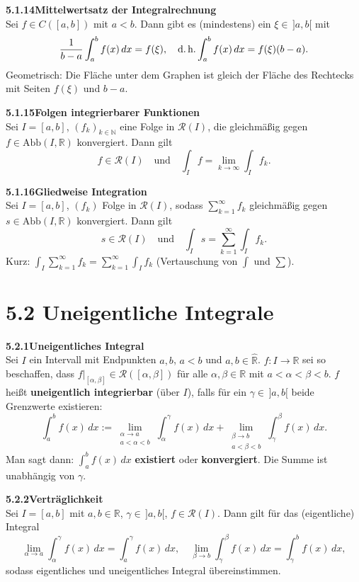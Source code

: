 \documentclass[a4paper,12pt]{article}
\newcommand{\gentry}[3]{%
  \noindent\textbf{#1\quad #2}\nopagebreak\\[0.2em]
  #3\par\smallskip
}
\begin{document}
\gentry{5.1.14}{Mittelwertsatz der Integralrechnung}{%
  Sei $f \in C([a,b])$ mit $a<b$. Dann gibt es (mindestens) ein
  $\xi \in\,]a,b[$ mit
  \[
    \frac{1}{b-a} \int_a^b f(x)\,dx = f(\xi),
    \quad \text{d.\,h.} \int_a^b f(x)\,dx = f(\xi)(b-a).
  \]
  Geometrisch: Die Fläche unter dem Graphen ist gleich der Fläche des Rechtecks
  mit Seiten $f(\xi)$ und $b-a$.
}

\gentry{5.1.15}{Folgen integrierbarer Funktionen}{%
  Sei $I=[a,b]$, $(f_k)_{k\in\mathbb{N}}$ eine Folge in $\mathcal{R}(I)$, die
  gleichmäßig gegen $f \in \mathrm{Abb}(I,\mathbb{R})$ konvergiert. Dann gilt
  \[
    f \in \mathcal{R}(I) \quad \text{und} \quad \int_I f = \lim_{k\to\infty} \int_I f_k.
  \]
}

\gentry{5.1.16}{Gliedweise Integration}{%
  Sei $I=[a,b]$, $(f_k)$ Folge in $\mathcal{R}(I)$, sodass $\sum_{k=1}^\infty f_k$
  gleichmäßig gegen $s \in \mathrm{Abb}(I, \mathbb{R})$ konvergiert. Dann gilt
  \[
    s \in \mathcal{R}(I) \quad \text{und} \quad \int_I s = \sum_{k=1}^\infty \int_I f_k.
  \]
  Kurz: $\int_I \sum_{k=1}^\infty f_k = \sum_{k=1}^\infty \int_I f_k$ (Vertauschung von
  $\int$ und $\sum$).
}

\section*{5.2 \quad Uneigentliche Integrale}

\gentry{5.2.1}{Uneigentliches Integral}{%
  Sei $I$ ein Intervall mit Endpunkten $a, b$, $a<b$ und $a,b \in \widehat{\mathbb{R}}$.
  $f: I \to \mathbb{R}$ sei so beschaffen, dass $f|_{[\alpha,\beta]} \in \mathcal{R}([\alpha,\beta])$
  für alle $\alpha, \beta \in \mathbb{R}$ mit $a<\alpha<\beta<b$.
  $f$ heißt \textbf{uneigentlich integrierbar} (über $I$), falls für ein
  $\gamma \in\,]a,b[$ beide Grenzwerte existieren:
  \[
    \int_a^b f(x)\,dx := \lim_{\substack{\alpha \to a\\ a<\alpha<b}}\int_\alpha^\gamma f(x)\,dx
    + \lim_{\substack{\beta \to b\\ a<\beta<b}}\int_\gamma^\beta f(x)\,dx.
  \]
  Man sagt dann: $\int_a^b f(x)\,dx$ \textbf{existiert} oder \textbf{konvergiert}.
  Die Summe ist unabhängig von $\gamma$.
}

\gentry{5.2.2}{Verträglichkeit}{%
  Sei $I=[a,b]$ mit $a,b\in\mathbb{R}$, $\gamma \in\,]a,b[$, $f \in \mathcal{R}(I)$.
  Dann gilt für das (eigentliche) Integral
  \[
    \lim_{\alpha \to a} \int_\alpha^\gamma f(x)\,dx = \int_a^\gamma f(x)\,dx,
    \quad \lim_{\beta \to b} \int_\gamma^\beta f(x)\,dx = \int_\gamma^b f(x)\,dx,
  \]
  sodass eigentliches und uneigentliches Integral übereinstimmen.
}
\end{document}

